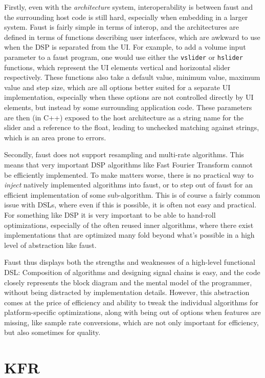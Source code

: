 Firstly, even with the \emph{architecture} system, interoperability is between faust and the surrounding host code is still hard, especially when embedding in a larger system. Faust is fairly simple in terms of interop, and the architectures are defined in terms of functions describing user interfaces, which are awkward to use when the DSP is separated from the UI. For example, to add a volume input parameter to a faust program, one would use either the \lstinline{vslider} or \lstinline{hslider} functions, which represent the UI elements vertical and horizontal slider respectively. These functions also take a default value, minimum value, maximum value and step size, which are all options better suited for a separate UI implementation, especially when these options are not controlled directly by UI elements, but instead by some surrounding application code. These parameters are then (in C++) exposed to the host architecture as a string name for the slider and a reference to the float, leading to unchecked matching against strings, which is an area prone to errors.

Secondly, faust does not support resampling and multi-rate algorithms. This means that very important DSP algorithms like Fast Fourier Transform cannot be efficiently implemented. To make matters worse, there is no practical way to \emph{inject} natively implemented algorithms into faust, or to step out of faust for an efficient implementation of some sub-algorithm. This is of course a fairly common issue with DSLs, where even if this is possible, it is often not easy and practical. For something like DSP it is very important to be able to hand-roll optimizations, especially of the often reused inner algorithms, where there exist implementations that are optimized many fold beyond what's possible in a high level of abstraction like faust.

Faust thus displays both the strengths and weaknesses of a high-level functional DSL: Composition of algorithms and designing signal chains is easy, and the code closely represents the block diagram and the mental model of the programmer, without being distracted by implementation details. However, this abstraction comes at the price of efficiency and ability to tweak the individual algorithms for platform-specific optimizations, along with being out of options when features are missing, like sample rate conversions, which are not only important for efficiency, but also sometimes for quality.


\section{KFR}


